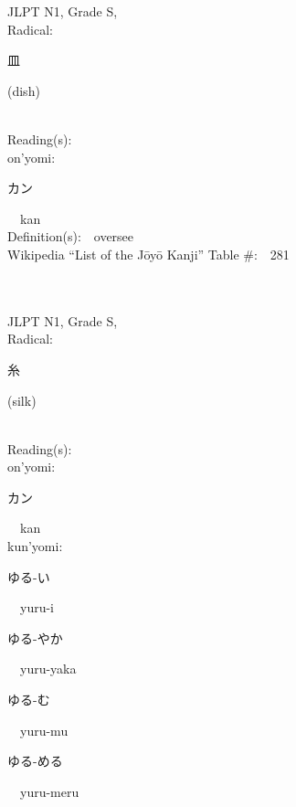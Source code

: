 \begin{multicols}{2}
{JLPT N1, Grade S, \\Radical:\ \ {\begin{CJK}{UTF8}{min} 皿 \end{CJK}} (dish) } \\
Reading(s):\ \ \\
{\hspace*{1em}}on'yomi:\ \ \\
{\hspace*{2em}}{\begin{CJK}{UTF8}{min} カン \end{CJK}}\ \ kan\ \ \\
Definition(s):\ \ oversee \\
Wikipedia ``List of the J\=oy\=o Kanji'' Table \#:\ \ 281 \\
\ \ \\
{\fontsize{34pt}{40pt}  }\ \ \\
{JLPT N1, Grade S, \\Radical:\ \ {\begin{CJK}{UTF8}{min} 糸 \end{CJK}} (silk) } \\
Reading(s):\ \ \\
{\hspace*{1em}}on'yomi:\ \ \\
{\hspace*{2em}}{\begin{CJK}{UTF8}{min} カン \end{CJK}}\ \ kan\ \ \\
{\hspace*{1em}}kun'yomi:\ \ \\
{\hspace*{2em}}{\begin{CJK}{UTF8}{min} ゆる-い \end{CJK}}\ \ yuru-i\ \ \\
{\hspace*{2em}}{\begin{CJK}{UTF8}{min} ゆる-やか \end{CJK}}\ \ yuru-yaka\ \ \\
{\hspace*{2em}}{\begin{CJK}{UTF8}{min} ゆる-む \end{CJK}}\ \ yuru-mu\ \ \\
{\hspace*{2em}}{\begin{CJK}{UTF8}{min} ゆる-める \end{CJK}}\ \ yuru-meru\ \ \\

\end{multicols}
